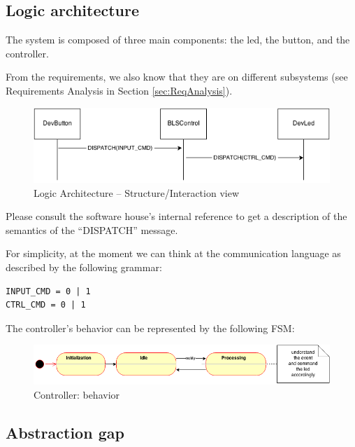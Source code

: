 \documentclass{article}
\begin{document}
\subsection{Logic architecture}

The system is composed of three main components: the led, the button, and the
controller.

From the requirements, we also know that they are on different subsystems (see
Requirements Analysis in Section \ref{sec:ReqAnalysis}).


\begin{figure}[H]
    \centering
     \includegraphics[scale=0.75]{img/BLSLogicalArch.png}
    \caption{Logic Architecture -- Structure/Interaction view}
    \label{fig:logicarch_inter}
\end{figure}

Please consult the software house's internal reference to get a description of
the semantics of the ``DISPATCH'' message.

For simplicity, at the moment we can think at the communication language as
described by the following grammar:

\begin{lstlisting}
INPUT_CMD = 0 | 1
CTRL_CMD = 0 | 1
\end{lstlisting}

The controller's behavior can be represented by the following FSM:

\begin{figure}[H]
    \centering
     \includegraphics[scale=0.65]{img/ISS-FSM-Controller.png}
    \caption{Controller: behavior}
\end{figure}



\subsection{Abstraction gap}
\end{document}
